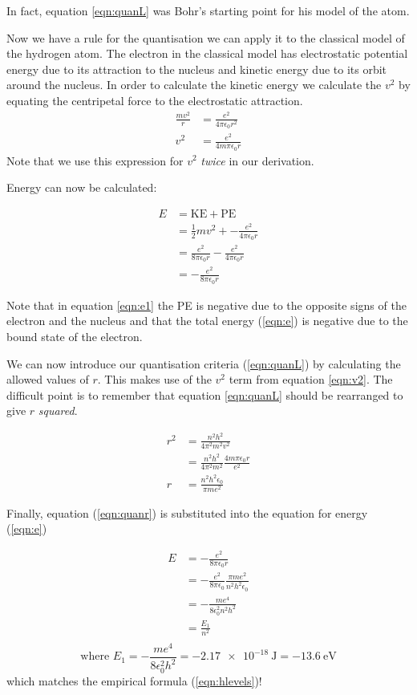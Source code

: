 \documentclass[revision-guide.tex]{subfiles}
\begin{document}
In fact, equation \ref{eqn:quanL} was Bohr's starting point for his model of the atom.

Now we have a rule for the quantisation we can apply it to the classical model of the hydrogen atom. The electron in the classical model has electrostatic potential energy due to its attraction to the nucleus and kinetic energy due to its orbit around the nucleus. In order to calculate the kinetic energy we calculate the $v^2$ by equating the centripetal force to the electrostatic attraction.
\begin{align}
\frac{mv^2}{r} &= \frac{e^2}{4\pi\epsilon_0 r^2} \nonumber \\
v^2 &= \frac{e^2}{4m\pi\epsilon_0 r}\label{eqn:v2}
\end{align}
Note that we use this expression for $v^2$ \emph{twice} in our derivation.

Energy can now be calculated:

\begin{align}
  E &= \text{KE} + \text{PE}\nonumber \\
  &= \frac{1}{2}mv^2 + -\frac{e^2}{4\pi\epsilon_0 r}\label{eqn:e1}\\
  &= \frac{e^2}{8\pi\epsilon_0 r} - \frac{e^2}{4\pi\epsilon_0 r} \nonumber \\
  &= -\frac{e^2}{8\pi\epsilon_0 r}\label{eqn:e}
\end{align}

Note that in equation \ref{eqn:e1} the PE is negative due to the opposite signs of the electron and the nucleus and that the total energy (\ref{eqn:e}) is negative due to the bound state of the electron.

We can now introduce our quantisation criteria (\ref{eqn:quanL}) by calculating the allowed values of $r$. This makes use of the $v^2$ term from equation \ref{eqn:v2}. The difficult point is to remember that equation \ref{eqn:quanL} should be rearranged to give $r$ \emph{squared}.

\begin{align}
  r^2 &= \frac{n^2 h^2}{4\pi^2 m^2 v^2}\\
  &= \frac{n^2 h^2}{4\pi^2 m^2} \frac{4m\pi\epsilon_0 r}{e^2}\\
  r &= \frac{n^2h^2\epsilon_0}{\pi m e^2} \label{eqn:quanr}
\end{align}

Finally, equation (\ref{eqn:quanr}) is substituted into the equation for energy (\ref{eqn:e})

\begin{align*}
  E &= -\frac{e^2}{8\pi\epsilon_0 r}\\
  &=  -\frac{e^2}{8\pi\epsilon_0} \frac{\pi m e^2}{n^2h^2\epsilon_0} \\
  &= - \frac{me^4}{8\epsilon_0^2 n^2 h^2}\\
  &= \frac{E_1}{n^2}\\
\end{align*}
\[   \text{where } E_1 = -\frac{me^4}{8\epsilon_0^2 h^2} = \SI{-2.17e-18}{\joule} = \SI{-13.6}{\electronvolt} \]
which matches the empirical formula (\ref{eqn:hlevels})!
\end{document}
